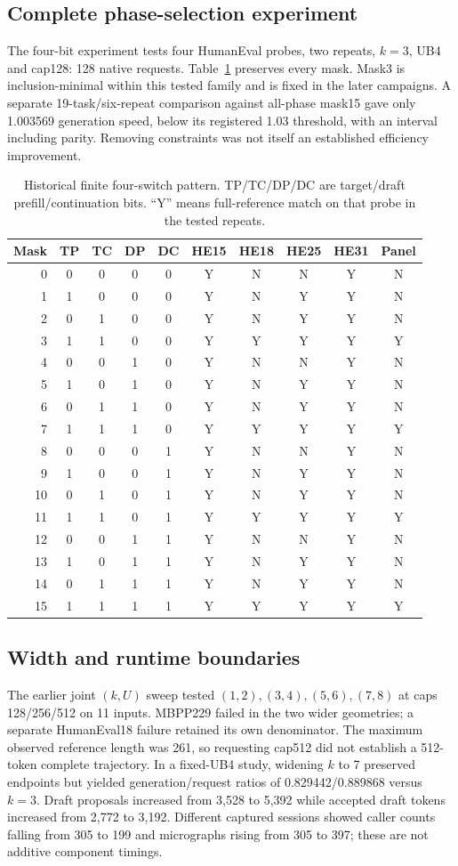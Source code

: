 \subsection{Complete phase-selection experiment}
The four-bit experiment tests four HumanEval probes, two repeats, $k=3$, UB4 and cap128: 128 native requests. Table~\ref{tab:masks} preserves every mask. Mask3 is inclusion-minimal within this tested family and is fixed in the later campaigns. A separate 19-task/six-repeat comparison against all-phase mask15 gave only 1.003569 generation speed, below its registered 1.03 threshold, with an interval including parity. Removing constraints was not itself an established efficiency improvement.
\begin{table}[t]\centering\small
\setlength{\tabcolsep}{2.8pt}
\caption{Historical finite four-switch pattern. TP/TC/DP/DC are target/draft prefill/continuation bits. ``Y'' means full-reference match on that probe in the tested repeats.}
\label{tab:masks}
\begin{tabular}{@{}rccccccccc@{}}\toprule
Mask&TP&TC&DP&DC&HE15&HE18&HE25&HE31&Panel\\\midrule
0&0&0&0&0&Y&N&N&Y&N\\
1&1&0&0&0&Y&N&Y&Y&N\\
2&0&1&0&0&Y&N&Y&Y&N\\
3&1&1&0&0&Y&Y&Y&Y&Y\\
4&0&0&1&0&Y&N&N&Y&N\\
5&1&0&1&0&Y&N&Y&Y&N\\
6&0&1&1&0&Y&N&Y&Y&N\\
7&1&1&1&0&Y&Y&Y&Y&Y\\
8&0&0&0&1&Y&N&N&Y&N\\
9&1&0&0&1&Y&N&Y&Y&N\\
10&0&1&0&1&Y&N&Y&Y&N\\
11&1&1&0&1&Y&Y&Y&Y&Y\\
12&0&0&1&1&Y&N&N&Y&N\\
13&1&0&1&1&Y&N&Y&Y&N\\
14&0&1&1&1&Y&N&Y&Y&N\\
15&1&1&1&1&Y&Y&Y&Y&Y\\\bottomrule
\end{tabular}
\end{table}
\subsection{Width and runtime boundaries}
The earlier joint $(k,U)$ sweep tested $(1,2),(3,4),(5,6),(7,8)$ at caps 128/256/512 on 11 inputs. MBPP229 failed in the two wider geometries; a separate HumanEval18 failure retained its own denominator. The maximum observed reference length was 261, so requesting cap512 did not establish a 512-token complete trajectory. In a fixed-UB4 study, widening $k$ to 7 preserved endpoints but yielded generation/request ratios of 0.829442/0.889868 versus $k=3$. Draft proposals increased from 3,528 to 5,392 while accepted draft tokens increased from 2,772 to 3,192. Different captured sessions showed caller counts falling from 305 to 199 and micrographs rising from 305 to 397; these are not additive component timings.

